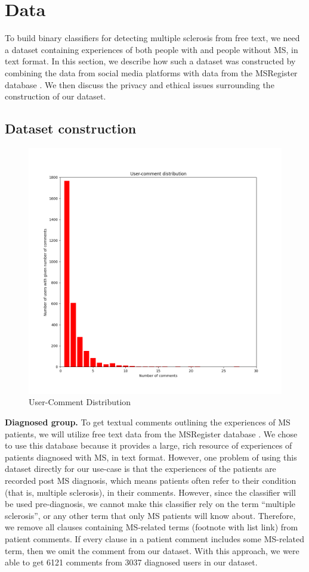 \documentclass[11pt,a4paper]{article}
\begin{document}
\section{Data}
\label{sec:data}
To build binary classifiers for detecting multiple sclerosis from free text, we need a dataset containing experiences of both people with and people without MS, in text format. In this section, we describe how such a dataset was constructed by combining the data from social media platforms with data from the MSRegister database \citep{Ford:12}. We then discuss the privacy and ethical issues surrounding the construction of our dataset.
\subsection{Dataset construction}
\begin{figure}[h!]
  \centering
   \includegraphics[width=\linewidth]{usercommentdistribution.png}
   \caption{User-Comment Distribution}
  \label{fig:usercomment}
\end{figure}
\textbf{Diagnosed group.} To get textual comments outlining the experiences of MS patients, we will utilize free text data from the MSRegister database \citep{Ford:12}. We chose to use this database because it provides a large, rich resource of experiences of patients diagnosed with MS, in text format. However, one problem of using this dataset directly for our use-case is that the experiences of the patients are recorded post MS diagnosis, which means patients often refer to their condition (that is, multiple sclerosis), in their comments. However, since the classifier will be used pre-diagnosis, we cannot make this classifier rely on the term “multiple sclerosis”, or any other term that only MS patients will know about. Therefore, we remove all clauses containing MS-related terms (footnote with list link) from patient comments. If every clause in a patient comment includes some MS-related term, then we omit the comment from our dataset. With this approach, we were able to get 6121 comments from 3037 diagnosed users in our dataset. \\
\end{document}
